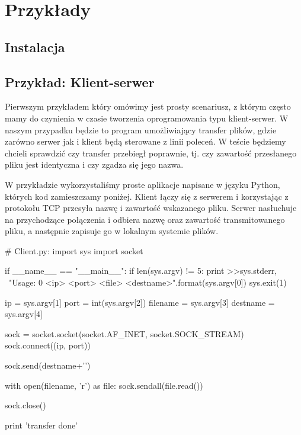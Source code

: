 \documentclass[00-praca-magisterska.tex]{subfiles}
\begin{document}
\chapter{Przykłady}

\section{Instalacja}


\section{Przykład: Klient-serwer}

Pierwszym przykładem który omówimy jest prosty scenariusz, z którym często mamy
do czynienia w czasie tworzenia oprogramowania typu klient-serwer. W naszym
przypadku będzie to program umożliwiający transfer plików, gdzie zarówno serwer
jak i klient będą sterowane z linii poleceń. W teście będziemy chcieli sprawdzić
czy transfer przebiegł poprawnie, tj. czy zawartość przesłanego pliku jest
identyczna i czy zgadza się jego nazwa.

W przykładzie wykorzystaliśmy proste aplikacje napisane w języku Python, których
kod zamieszczamy poniżej. Klient łączy się z serwerem i korzystając z protokołu
TCP przesyła nazwę i zawartość wskazanego pliku. Serwer nasłuchuje na
przychodzące połączenia i odbiera nazwę oraz zawartość transmitowanego pliku, a
następnie zapisuje go w lokalnym systemie plików.

\begin{pythoncode}
  # Client.py:
  import sys
  import socket

  if __name__ == "__main__":
      if len(sys.argv) != 5:
	  print >>sys.stderr, \
	      "Usage: {0} <ip> <port> <file> <destname>".format(sys.argv[0])
	  sys.exit(1)

      ip = sys.argv[1]
      port = int(sys.argv[2])
      filename = sys.argv[3]
      destname = sys.argv[4]

      sock = socket.socket(socket.AF_INET, socket.SOCK_STREAM)
      sock.connect((ip, port))

      sock.send(destname+'\n')

      with open(filename, 'r') as file:
          sock.sendall(file.read())

      sock.close()

      print 'transfer done'

\end{pythoncode}
\end{document}
